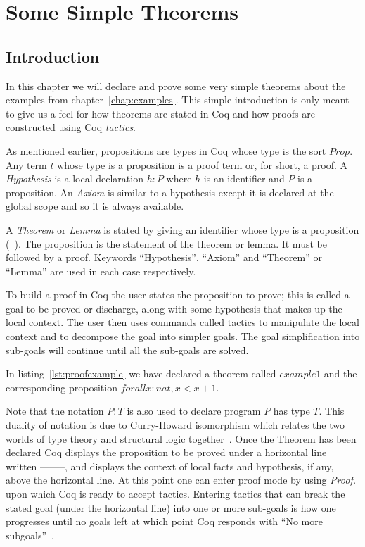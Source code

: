 \chapter{Some Simple Theorems}

\section{Introduction}

In this chapter we will declare and prove some very simple theorems about the examples from chapter~\ref{chap:examples}. This simple introduction is only meant to give us a feel for how theorems are stated in Coq and how proofs are constructed using Coq \emph{tactics}. 

As mentioned earlier, propositions are types in Coq whose type is the sort $Prop$. Any term $t$ whose type is a proposition is a proof term or, for short, a proof. A \emph{Hypothesis} is a local declaration $h : P$ where $h$ is an identifier and $P$ is a proposition. An \emph{Axiom} is similar to a hypothesis except it is declared at the global scope and so it is always available. 

A \emph{Theorem} or \emph{Lemma} is stated by giving an identifier whose type is a proposition (~\cite{BC04}).  The proposition is the statement of the theorem or lemma.  It must be followed by a proof. Keywords ``Hypothesis'', ``Axiom'' and ``Theorem'' or ``Lemma'' are used in each case respectively. 

To build a proof in Coq the user states the proposition to prove; this is called a goal to be proved or discharge, along with some hypothesis that makes up the local context. The user then uses commands called tactics to manipulate the local context and to decompose the goal into simpler goals. The goal simplification into sub-goals will continue until all the sub-goals are solved.

In listing~\ref{lst:proofexample} we have declared a theorem called $example1$ and the corresponding proposition $forall x:nat, x < x + 1.$
 
Note that the notation $P : T$ is also used to declare program $P$ has type $T$. This duality of notation is due to Curry-Howard isomorphism which relates the two worlds of type theory and structural logic together~\cite{BC04}. Once the Theorem has been declared Coq displays the proposition to be proved under a horizontal line written --------, and displays the context of local facts and hypothesis, if any, above the horizontal line. At this point one can enter proof mode by using \emph{Proof.} upon which Coq is ready to accept tactics. Entering tactics that can break the stated goal (under the horizontal line) into one or more sub-goals is how one progresses until no goals left at which point Coq responds with ``No more subgoals''~\cite{CoqHurry}.

